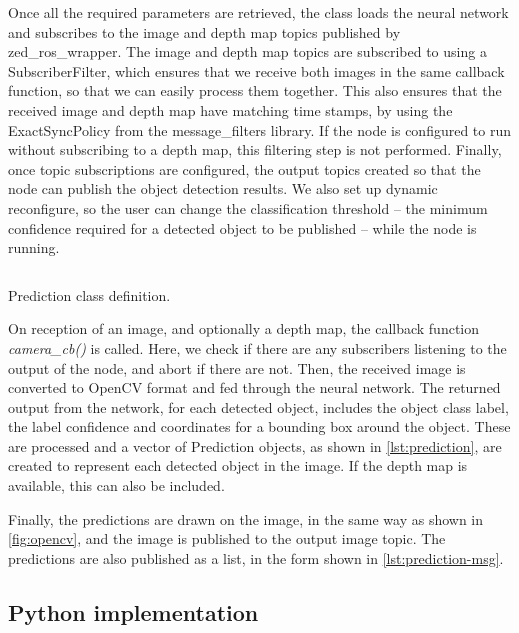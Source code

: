\documentclass[\rootfolder/main.tex]{subfiles}
\begin{document}
Once all the required parameters are retrieved, the class loads the neural network and subscribes to the image and depth map topics published by zed\_ros\_wrapper.
The image and depth map topics are subscribed to using a SubscriberFilter, which ensures that we receive both images in the same callback function, so that we can easily process them together.
This also ensures that the received image and depth map have matching time stamps, by using the ExactSyncPolicy from the message\_filters library.
If the node is configured to run without subscribing to a depth map, this filtering step is not performed.
Finally, once topic subscriptions are configured, the output topics created so that the node can publish the object detection results.
We also set up dynamic reconfigure, so the user can change the classification threshold -- the minimum confidence required for a detected object to be published -- while the node is running.

\begin{listing}
    \inputminted{cpp}{\rootfolder/Chapters/Chapter5/Listings/Prediction}
    \caption{Prediction class definition.}
    \label{lst:prediction}
\end{listing}

On reception of an image, and optionally a depth map, the callback function \emph{camera\_cb()} is called.
Here, we check if there are any subscribers listening to the output of the node, and abort if there are not.
Then, the received image is converted to OpenCV format and fed through the neural network.
The returned output from the network, for each detected object, includes the object class label, the label confidence and coordinates for a bounding box around the object.
These are processed and a vector of Prediction objects, as shown in \cref{lst:prediction}, are created to represent each detected object in the image.
If the depth map is available, this can also be included.

Finally, the predictions are drawn on the image, in the same way as shown in \cref{fig:opencv}, and the image is published to the output image topic.
The predictions are also published as a list, in the form shown in \cref{lst:prediction-msg}.


\subsection{Python implementation}
\end{document}
